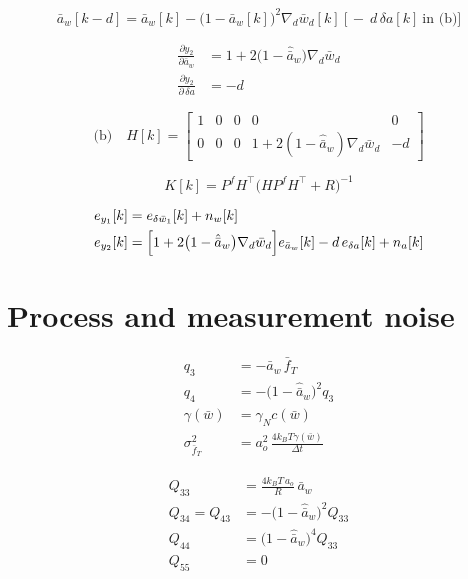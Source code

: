 \documentclass[11pt,a4paper,fontset=none]{ctexart}
\newcommand{\ba}{\bar{a}}
\newcommand{\bw}{\bar{w}}
\begin{document}
\begin{equation*}
\ba_w[k-d] = \ba_w[k] - \bigl(1-\ba_w[k]\bigr)^{2}\nabla_d\bw_d[k]
  \ \bigl[\,-\ d\,\delta a[k]\ \text{in (b)}\bigr]
\end{equation*}

\begin{align*}
\frac{\partial y_2}{\partial \ba_w}
  &= 1 + 2\bigl(1-\hat{\ba}_w\bigr)\nabla_d\bw_d \\
\frac{\partial y_2}{\partial\,\delta a} &= -d
\end{align*}

\begin{equation*}
\text{(b)}\quad
H[k] =
\begin{bmatrix}
1 & 0 & 0 & 0 & 0 \\
0 & 0 & 0 & 1 + 2(1-\hat{\ba}_w)\nabla_d\bw_d & -d
\end{bmatrix}
\end{equation*}

\begin{equation*}
K[k] = P^f H^{\top}\bigl(HP^fH^{\top}+R\bigr)^{-1}
\end{equation*}

\begin{align*}
e_{y_1}[k] &= e_{\delta\bw_1}[k] + n_w[k] \\
e_{y_2}[k] &= \Bigl[1 + 2\bigl(1-\hat{\ba}_w\bigr)\nabla_d\bw_d\Bigr]
    e_{\ba_w}[k] - d\,e_{\delta a}[k] + n_a[k]
\end{align*}

\section{Process and measurement noise}

\begin{align*}
q_3 &= -\ba_w\,\bar{f}_T \\
q_4 &= -\bigl(1-\hat{\ba}_w\bigr)^{2}q_3 \\
\gamma(\bw) &= \gamma_N c(\bw) \\
\sigma^{2}_{\bar{f}_T} &= a_o^{2}\,\frac{4k_BT\gamma(\bw)}{\Delta t}
\end{align*}

\begin{align*}
Q_{33} &= \frac{4k_BT\,a_o}{R}\,\ba_w \\
Q_{34} = Q_{43} &= -\bigl(1-\hat{\ba}_w\bigr)^{2}Q_{33} \\
Q_{44} &= \bigl(1-\hat{\ba}_w\bigr)^{4}Q_{33} \\
Q_{55} &= 0
\end{align*}
\end{document}
